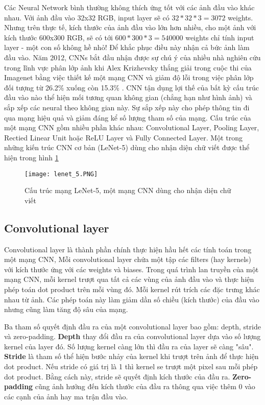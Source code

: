 Các Neural Network bình thường không thích ứng tốt với các ảnh đầu vào khác nhau. Với ảnh đầu vào 32x32 RGB, input layer sẽ có $32*32*3 = 3072$ weights. Nhưng trên thực tế, kích thước của ảnh đầu vào lớn hơn nhiều, cho một ảnh với kích thước 600x300 RGB, sẽ có tới $600*300*3 = 540000$ weights chỉ tính input layer - một con số không hề nhỏ! Để khắc phục điều này nhận cả bức ảnh làm đầu vào. Năm 2012, CNNs bắt đầu nhận được sự chú ý của nhiều nhà nghiên cứu trong lĩnh vực phân lớp ảnh khi Alex Krizhevsky thắng giải trong cuộc thi của Imagenet bằng việc thiết kế một mạng CNN và giảm độ lỗi trong việc phân lớp đối tượng từ 26.2\% xuống còn 15.3\% \cite{krizhevsky2012imagenet}. CNN tận dụng lợi thế của bất kỳ cấu trúc đầu vào nào thể hiện mối tương quan không gian (chẳng hạn như hình ảnh) và sắp xếp các neural theo không gian này. Sự sắp xếp này cho phép thông tin đi qua mạng hiệu quả và giảm đáng kể số lượng tham số của mạng. Cấu trúc của một mạng CNN gồm nhiều phần khác nhau: Convolutional Layer, Pooling Layer, Rectied Linear Unit hoặc ReLU Layer và Fully Connected Layer. Một trong những kiến trúc CNN cơ bản (LeNet-5) \cite{lecun1998gradient} dùng cho nhận diện chữ viết được thể hiện trong hình \ref{fig:lenet_5}

\begin{figure}[h!]
	\centering
	\captionsetup{width=0.7\textwidth}
	\texttt{[image: lenet\_5.PNG]}
	\caption{Cấu trúc mạng LeNet-5, một mạng CNN dùng cho nhận diện chữ viết}
    \label{fig:lenet_5}
\end{figure}

\subsection*{Convolutional layer}
Convolutional layer là thành phần chính thực hiện hầu hết các tính toán trong một mạng CNN, Mỗi convolutional layer chứa một tập các filters (hay kernels) với kích thước ứng với các weights và biases. Trong quá trình lan truyền của một mạng CNN, mỗi kernel trượt qua tất cả các vùng của ảnh đầu vào và thực hiện phép toán dot product trên mỗi vùng đó. Mỗi kernel rút trích các đặc trưng khác nhau từ ảnh. Các phép toán này làm giảm dần số chiều (kích thước) của đầu vào nhưng cũng làm tăng độ sâu của mạng.

Ba tham số quyết định đầu ra của một convolutional layer bao gồm: depth, stride và zero-padding. \textbf{Depth} thay đổi đầu ra của convolutional layer dựa vào số lượng kernel của layer đó. Số lượng kernel càng lớn thì đầu ra của layer sẽ càng "sâu". \textbf{Stride} là tham số thể hiện bước nhảy của kernel khi trượt trên ảnh để thực hiện dot product. Nếu stride có giá trị là 1 thì kernel se trượt một pixel sau mỗi phép dot product. Bằng cách này, stride sẽ quyết định kích thước của đầu ra. \textbf{Zero-padding} cũng ảnh hưởng đến kích thước của đầu ra thông qua việc thêm 0 vào các cạnh của ảnh hay ma trận đầu vào. 

